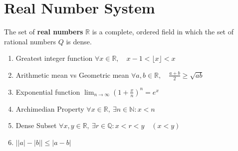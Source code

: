 \section{Real Number System}
	The set of \textbf{real numbers} $\mathbb{R}$ is a complete,  ordered field in which the set of rational numbers $Q$ is dense.
\begin{enumerate}
	\item Greatest integer function
		$ \forall x \in \mathbb{R},\quad x-1 < \lfloor x \rfloor < x $ %
	\item Arithmetic mean vs Geometric mean
		$ \forall a,b \in \mathbb{R},\quad \frac{a+b}{2} \ge \sqrt{ab} $ 
	\item Exponential function
		$ \displaystyle \lim_{n \to \infty} \left(1+\frac{x}{n}\right)^n = e^x $
	\item Archimedian Property
		$ \forall x \in \mathbb{R},\ \exists n \in \mathbb{N} : x < n $ 
	\item Dense Subset
		$ \forall x,y \in \mathbb{R},\ \exists r \in \mathbb{Q} : x < r < y \quad (x<y) $
	\item $ \left| |a|-|b| \right|  \le |a-b| $
\end{enumerate}

